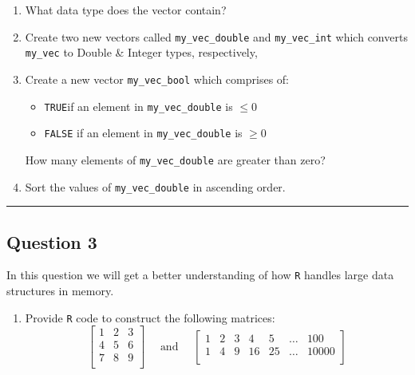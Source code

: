 \documentclass[
  letterpaper,
  DIV=11,
  numbers=noendperiod]{scrartcl}
\providecommand{\tightlist}{%
  \setlength{\itemsep}{0pt}\setlength{\parskip}{0pt}}\usepackage{longtable,booktabs,array}
\begin{document}
\begin{enumerate}
\def\labelenumi{\arabic{enumi}.}
\item
  What data type does the vector contain?
\item
  Create two new vectors called \texttt{my\_vec\_double} and
  \texttt{my\_vec\_int} which converts \texttt{my\_vec} to Double \&
  Integer types, respectively,
\item
  Create a new vector \texttt{my\_vec\_bool} which comprises of:

  \begin{itemize}
  \tightlist
  \item
    \texttt{TRUE}if an element in \texttt{my\_vec\_double} is \(\le 0\)
  \item
    \texttt{FALSE} if an element in \texttt{my\_vec\_double} is
    \(\ge 0\)
  \end{itemize}

  How many elements of \texttt{my\_vec\_double} are greater than zero?
\item
  Sort the values of \texttt{my\_vec\_double} in ascending order.
\end{enumerate}

\begin{center}\rule{0.5\linewidth}{0.5pt}\end{center}

\hypertarget{question-3}{%
\subsection{Question 3}\label{question-3}}

\begin{tcolorbox}[enhanced jigsaw, leftrule=.75mm, breakable, colframe=quarto-callout-tip-color-frame, coltitle=black, colback=white, opacitybacktitle=0.6, colbacktitle=quarto-callout-tip-color!10!white, left=2mm, titlerule=0mm, bottomtitle=1mm, bottomrule=.15mm, title=\textcolor{quarto-callout-tip-color}{\faLightbulb}\hspace{0.5em}{50 points}, arc=.35mm, rightrule=.15mm, toptitle=1mm, toprule=.15mm, opacityback=0]

\end{tcolorbox}

In this question we will get a better understanding of how \texttt{R}
handles large data structures in memory.

\begin{enumerate}
\def\labelenumi{\arabic{enumi}.}
\tightlist
\item
  Provide \texttt{R} code to construct the following matrices: \[
  \begin{bmatrix} 
  1 & 2 & 3\\
  4 & 5 & 6\\
  7 & 8 & 9\\
  \end{bmatrix}
  \quad \text{ and } \quad
  \begin{bmatrix} 
  1 & 2 & 3 & 4 & 5 & \dots & 100\\
  1 & 4 & 9 & 16 & 25 & \dots & 10000\\
  \end{bmatrix}
  \]
\end{enumerate}
\end{document}
